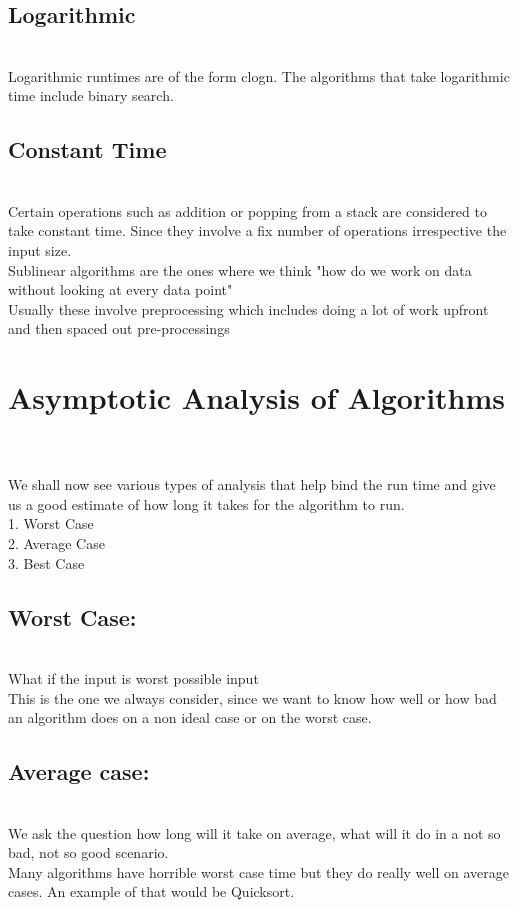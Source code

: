 \subsection{Logarithmic}
\\ Logarithmic runtimes are of the form clogn. The algorithms that take logarithmic time include binary search.
\subsection{ Constant Time}
\\ Certain operations such as addition or popping from a stack are considered to take constant time. Since they involve a fix number of operations irrespective the input size. 
\\Sublinear algorithms are the ones where we think "how do we work on data without looking at every data point"
\\Usually these involve preprocessing which includes doing a lot of work upfront and then spaced out pre-processings
\section{Asymptotic Analysis of Algorithms}
\\
\\ We shall now see various types of analysis that help bind the run time and give us a good estimate of how long it takes for the algorithm to run.
\\	1. Worst Case
\\	2. Average Case
\\	3. Best Case

\subsection{Worst Case:}
\\What if the input is worst possible input
\\ This is the one we always consider, since we want to know how well or how bad an algorithm does on a non ideal case or on the worst case.
\\
\subsection{Average case:}
\\We ask the question how long will it take on average, what will it do in a not so bad, not so good scenario.
\\Many algorithms have horrible worst case time but they do really well on average cases. An example of that would be Quicksort.
